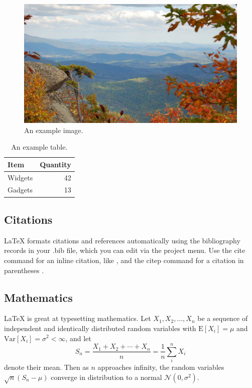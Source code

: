 \documentclass[fleqn,10pt,lineno]{wlpeerj} %
\begin{document}
\begin{figure}[ht]
\centering
\includegraphics[width=\linewidth]{view.jpg}
\caption{An example image.}
\label{fig:view}
\end{figure}

\begin{table}[ht]
\centering
\begin{tabular}{l|r}
Item & Quantity \\\hline
Widgets & 42 \\
Gadgets & 13
\end{tabular}
\caption{\label{tab:widgets}An example table.}
\end{table}

\subsection*{Citations}

LaTeX formats citations and references automatically using the bibliography records in your .bib file, which you can edit via the project menu. Use the cite command for an inline citation, like \cite{Figueredo:2009dg}, and the citep command for a citation in parentheses \citep{Figueredo:2009dg}.

\subsection*{Mathematics}

\LaTeX{} is great at typesetting mathematics. Let $X_1, X_2, \ldots, X_n$ be a sequence of independent and identically distributed random variables with $\text{E}[X_i] = \mu$ and $\text{Var}[X_i] = \sigma^2 < \infty$, and let
$$S_n = \frac{X_1 + X_2 + \cdots + X_n}{n}
      = \frac{1}{n}\sum_{i}^{n} X_i$$
denote their mean. Then as $n$ approaches infinity, the random variables $\sqrt{n}(S_n - \mu)$ converge in distribution to a normal $\mathcal{N}(0, \sigma^2)$.
\end{document}
